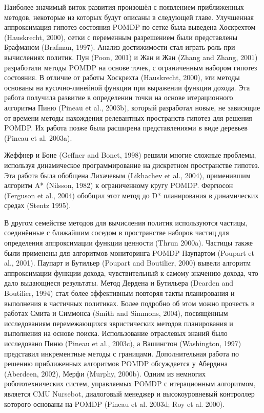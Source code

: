 \documentclass[10pt,a4paper]{article}
\begin{document}
Наиболее значимый виток развития произошёл с появлением приближенных методов, некоторые из которых будут описаны в следующей главе. Улучшенная аппроксимация гипотез состояния POMDP по сетке была выведена Хоскрехтом (Hauskrecht, 2000), сетки с переменным разрешением были представлены Брафманом (Brafman, 1997). Анализ достижимости стал играть роль при вычислениях политик. Пун (Poon, 2001) и Жан и Жан (Zhang and Zhang, 2001) разработали методы POMDP на основе точек, с ограниченным набором гипотез состояния. В отличие от работы Хоскрехта (Hauskrecht, 2000), эти методы основаны на кусочно-линейной функции при выражении функции дохода. Эта работа получила развитие в определении точки на основе  итерационного алгоритма Пиню (Pineau et al., 2003b), который разработал новые, не зависящие от времени методы нахождения релевантных пространств гипотез для решения POMDP. Их работа позже была расширена представлениями в виде деревьев (Pineau et al. 2003a).

Жеффнер и Боне (Geffner and Bonet, 1998) решили многие сложные проблемы, используя динамическое программирование на дискретном пространстве гипотез. Эта работа была обобщена Лихачевым (Likhachev  et al., 2004), применившим алгоритм A* (Nilsson, 1982) к ограниченному кругу POMDP. Фергюсон (Ferguson et al., 2004) обобщил этот метод до D* планирования в динамических средах (Stentz 1995).

В другом семействе методов для вычисления политик используются частицы, соединённые с ближайшим соседом в пространстве наборов частиц для определения аппроксимации функции ценности (Thrun 2000a). Частицы также были применены для алгоритмов мониторинга POMDP  Паупартом (Poupart et al., 2001). Паупарт и Бутильер (Poupart and Boutilier, 2000) вывели алгоритм аппроксимации функции дохода, чувствительный к самому значению дохода, что дало выдающиеся результаты. Метод Дердена и Бутильера (Dearden and Boutilier, 1994) стал более эффективным повторяя такты планирования и выполнения в частичных политиках. Более подробно об этом можно прочесть в работах Смита и Симмонса (Smith and Simmons, 2004), посвящённым исследованиям перемежающихся эвристических методов планирования и выполнения на основе поиска. Использование отраслевых знаний было исследовано Пиню (Pineau et al., 2003c), а Вашингтон (Washington, 1997) представил инкрементные методы с границами. Дополнительная работа по решению приближенных алгоритмов POMDP обсуждается у Абердина (Aberdeen, 2002), Мерфи (Murphy, 2000b). Одним из немногих робототехнических систем, управляемых POMDP с итерационным алгоритмом, является CMU Nursebot, диалоговый менеджер и высокоуровневый контроллер которого основаны на POMDP (Pineau et al. 2003d; Roy et al. 2000).
\end{document}
